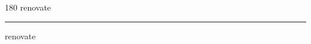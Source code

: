 
\begin{frame}
\begin{center}
\begin{turn}{180}
{\fontsize{2.5cm}{1em}\selectfont renovate}
\end{turn}
\vspace{1em}\par  
\hrule
\vspace{1em}\par  
{\fontsize{2.5cm}{1em}\selectfont renovate}
\end{center}
\end{frame}
